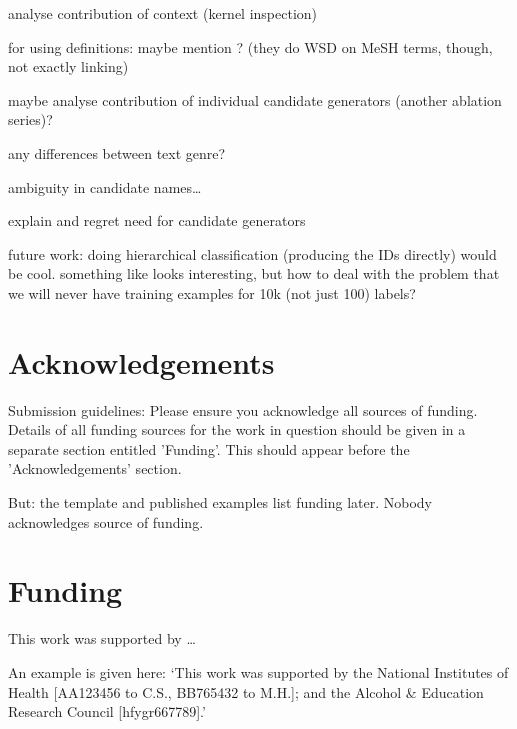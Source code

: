 \documentclass{bioinfo}
\begin{document}
analyse contribution of context (kernel inspection)

for using definitions: maybe mention \cite{tulkens-et-al:2016:BioNLP}? (they do WSD on MeSH terms, though, not exactly linking)

maybe analyse contribution of individual candidate generators (another ablation series)?

any differences between text genre?

ambiguity in candidate names\dots

explain and regret need for candidate generators

future work: doing hierarchical classification (producing the IDs directly) would be cool. something like \cite{guo-et-al:2018} looks interesting, but how to deal with the problem that we will never have training examples for 10k (not just 100) labels?



\section*{Acknowledgements}

Submission guidelines:
Please ensure you acknowledge all sources of funding.
Details of all funding sources for the work in question should be given in a separate section entitled 'Funding'. This should appear before the 'Acknowledgements' section.

But: the template and published examples list funding later.
Nobody acknowledges source of funding.
\vspace*{-12pt}



\section*{Funding}

This work was supported by \dots

An example is given here: ‘This work was supported by the National Institutes of Health [AA123456 to C.S., BB765432 to M.H.]; and the Alcohol \& Education Research Council [hfygr667789].’
\vspace*{-12pt}





\end{document}
